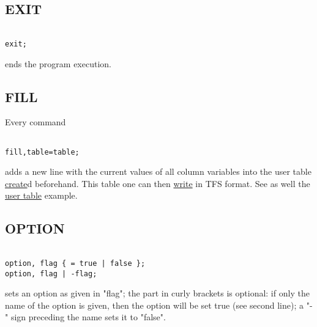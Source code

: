 \subsection{EXIT}
\begin{verbatim}

exit;
\end{verbatim} 
ends the program execution. 


\subsection{FILL} 
Every command 
\begin{verbatim}

fill,table=table;
\end{verbatim} 
adds a new line with the current values of all column variables into the
user table \hyperlink{create}{create}d beforehand. This table one can
then \hyperlink{write}{write} in TFS format.  See as well the
\href{../Introduction/select.html#ucreate}{user table} example.  


\subsection{OPTION}
\begin{verbatim}

option, flag { = true | false };
option, flag | -flag;
\end{verbatim} 
sets an option as given in "flag"; the part in curly brackets is
optional: if only the name of the option is given, then the option will
be set true (see second line); a "-" sign preceding the name sets it to
"false".  

